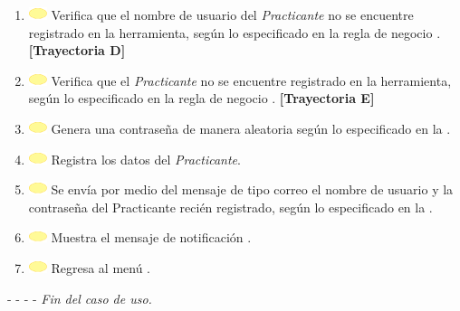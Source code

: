 \begin{enumerate}
	\item \includegraphics[width=15pt]{./Figuras/iconosCU/herramienta.png} Verifica que el nombre de usuario del \textit{Practicante} no se encuentre registrado en la herramienta, según lo especificado en la regla de negocio .  \textbf{[Trayectoria D]}
	\item \includegraphics[width=15pt]{./Figuras/iconosCU/herramienta.png} Verifica que el \textit{Practicante} no se encuentre registrado en la herramienta, según lo especificado en la regla de negocio . \textbf{[Trayectoria E]}
	\item \includegraphics[width=15pt]{./Figuras/iconosCU/herramienta.png} Genera una contraseña de manera aleatoria según lo especificado en la .
	\item \includegraphics[width=15pt]{./Figuras/iconosCU/herramienta.png} Registra los datos del \textit{Practicante}.
	\item \includegraphics[width=15pt]{./Figuras/iconosCU/herramienta.png} Se envía por medio del mensaje de tipo correo  el nombre de usuario y la contraseña del Practicante recién registrado, según lo especificado en la .
	\item \includegraphics[width=15pt]{./Figuras/iconosCU/herramienta.png} Muestra el mensaje de notificación .
	\item \includegraphics[width=15pt]{./Figuras/iconosCU/herramienta.png} Regresa al menú .
\end{enumerate}
	
- - - - \textit{Fin del caso de uso.} \\

